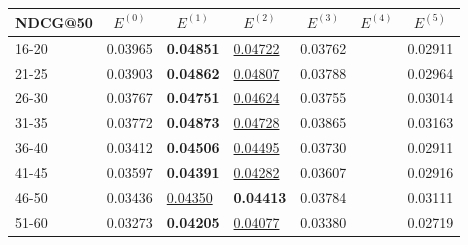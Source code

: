 \begin{table*}[]
    \centering
    \begin{tabular}{|l|l|l|l|l|l|l|}
        \hline
        NDCG@50 & \multicolumn{1}{c|}{$E^{(0)}$} & \multicolumn{1}{c|}{$E^{(1)}$} & \multicolumn{1}{c|}{$E^{(2)}$} & \multicolumn{1}{c|}{$E^{(3)}$} & \multicolumn{1}{c|}{$E^{(4)}$} & \multicolumn{1}{c|}{$E^{(5)}$} \\ \hline
        16-20   & 0.03965                        & \textbf{0.04851}               & \underline{0.04722}            & 0.03762                        &                                & 0.02911                                \\ \hline
        21-25   & 0.03903                        & \textbf{0.04862}               & \underline{0.04807}            & 0.03788                        &                                & 0.02964                               \\ \hline
        26-30   & 0.03767                        & \textbf{0.04751}               & \underline{0.04624}            & 0.03755                        &                                & 0.03014                               \\ \hline
        31-35   & 0.03772                        & \textbf{0.04873}               & \underline{0.04728}            & 0.03865                        &                                & 0.03163                               \\ \hline
        36-40   & 0.03412                        & \textbf{0.04506}               & \underline{0.04495}            & 0.03730                        &                                & 0.02911                               \\ \hline
        41-45   & 0.03597                        & \textbf{0.04391}               & \underline{0.04282}            & 0.03607                        &                                & 0.02916                               \\ \hline
        46-50   & 0.03436                        & \underline{0.04350}            & \textbf{0.04413}               & 0.03784                        &                                & 0.03111                               \\ \hline
        51-60   & 0.03273                        & \textbf{0.04205}               & \underline{0.04077}            & 0.03380                        &                                & 0.02719                               \\ \hline

\end{tabular}
\end{table*}
